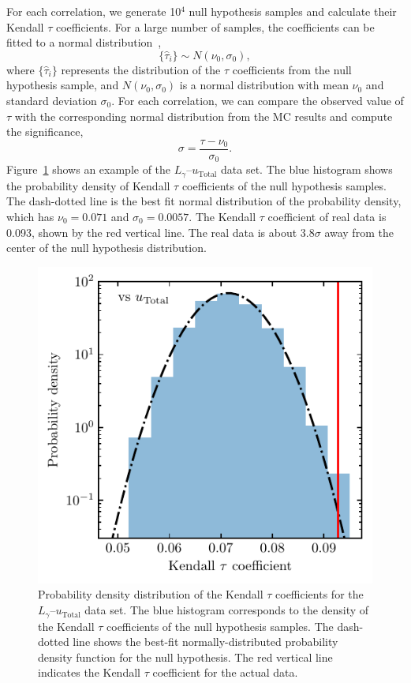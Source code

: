 \documentclass[doublespace,draft,nopageskip]{VTthesis} %
\begin{document}
For each correlation, we generate 10$^4$ null hypothesis samples and calculate their Kendall $\tau$ coefficients. For a large number of samples, the coefficients can be fitted to a normal distribution~\citep{10.2307/2669997},
\begin{equation}
    \{\hat{\tau}_i\} \sim N(\nu_0,\sigma_0),
\end{equation}
where $\{\hat{\tau}_i\}$ represents the distribution of the $\tau$ coefficients from the null hypothesis sample, and $N(\nu_0,\sigma_0)$ is a normal distribution with mean $\nu_0$ and standard deviation $\sigma_0$. For each correlation, we can compare the observed value of $\tau$ with the corresponding normal distribution from the MC results and compute the significance,
\begin{equation}
    \sigma = \frac{\tau - \nu_0}{\sigma_0}.
\end{equation}
Figure~\ref{fig:hist} shows an example of the $L_\gamma$--$u_\mathrm{Total}$ data set. The blue histogram shows the probability density of Kendall $\tau$ coefficients of the null hypothesis samples. The dash-dotted line is the best fit normal distribution of the probability density, which has $\nu_0 = 0.071$ and $\sigma_0 = 0.0057$. The Kendall $\tau$ coefficient of real data is 0.093, shown by the red vertical line. The real data is about 3.8$\sigma$ away from the center of the null hypothesis distribution.

\begin{figure}
    \centering
    \includegraphics[width=\columnwidth]{Figures/Globular/hist_urad.pdf}
    \caption{ Probability density distribution of the Kendall $\tau$ coefficients for the $L_\gamma$--$u_\mathrm{Total}$ data set. The blue histogram %
    corresponds to the density of the Kendall $\tau$ coefficients of the null hypothesis samples. The dash-dotted line shows the best-fit normally-distributed probability density function for the null hypothesis. The red vertical line indicates the Kendall $\tau$ coefficient for the %
    actual data.}
    \label{fig:hist}
\end{figure}
\end{document}

